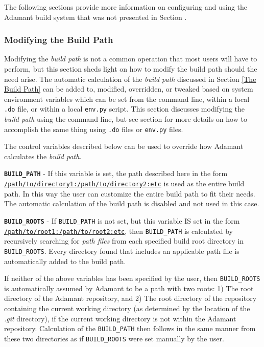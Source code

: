 The following sections provide more information on configuring and using the Adamant build system that was not presented in Section \label{Using the Build System}.

\subsubsection{Modifying the Build Path} \label{Modifying Build Path}

Modifying the \textit{build path} is not a common operation that most users will have to perform, but this section sheds light on how to modify the build path should the need arise. The automatic calculation of the \textit{build path} discussed in Section \ref{The Build Path} can be added to, modified, overridden, or tweaked based on system environment variables which can be set from the command line, within a local \texttt{.do} file, or within a local \texttt{env.py} script. This section discusses modifying the \textit{build path} using the command line, but see section \label{Setting the Environment} for more details on how to accomplish the same thing using \texttt{.do} files or \texttt{env.py} files. 

The control variables described below can be used to override how Adamant calculates the \textit{build path}.

\vspace{5mm} %
\begin{spaceditemize}
  \item \textbf{\texttt{BUILD\_PATH}} - If this variable is set, the path described here in the form \texttt{\url{/path/to/directory1:/path/to/directory2:etc}} is used as the entire build path. In this way the user can customize the entire build path to fit their needs. The automatic calculation of the build path is disabled and not used in this case.
  \item \textbf{\texttt{BUILD\_ROOTS}} - If \texttt{BUILD\_PATH} is not set, but this variable IS set in the form \texttt{\url{/path/to/root1:/path/to/root2:etc}}, then \texttt{BUILD\_PATH} is calculated by recursively searching for \textit{path files} from each specified build root directory in \texttt{BUILD\_ROOTS}. Every directory found that includes an applicable path file is automatically added to the build path. 
\end{spaceditemize}
\vspace{5mm} %

If neither of the above variables has been specified by the user, then \texttt{BUILD\_ROOTS} is automatically assumed by Adamant to be a path with two roots: 1) The root directory of the Adamant repository, and 2) The root directory of the repository containing the current working directory (as determined by the location of the \textit{.git} directory), if the current working directory is not within the Adamant repository. Calculation of the \texttt{BUILD\_PATH} then follows in the same manner from these two directories as if \texttt{BUILD\_ROOTS} were set manually by the user.

